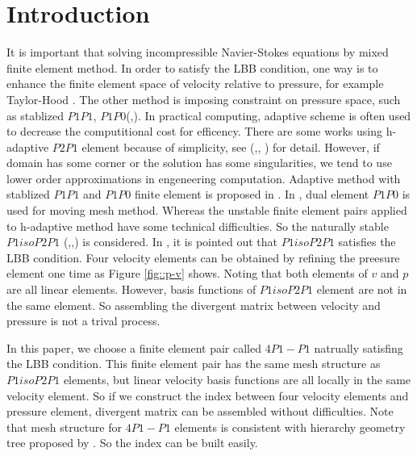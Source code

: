 \documentclass[a4paper, 11pt]{article}
\begin{document}
\section{Introduction}

    It is important that solving incompressible
    Navier-Stokes equations by mixed finite element method. In order to
    satisfy the LBB condition, one way is to enhance the finite
    element space of velocity relative to pressure, for example 
    Taylor-Hood \cite{taylor1974navier}. The other method is imposing
    constraint on pressure space, such as stablized $P1P1$,
    $P1P0$(\cite{li2009performance},\cite{bochev2006stabilization}). 
    In practical computing, adaptive scheme is often used to decrease the
    computitional cost for efficency. There are some works
    using h-adaptive $P2P1$ element because of simplicity, see
    (\cite{danaila2014newton},\cite{ebeida2009unsteady},
    \cite{berrone2009space}) for detail. However, if domain has some
    corner or the solution has some singularities, we tend to use lower
    order approximations in engeneering computation. Adaptive method with
    stablized $P1P1$ and $P1P0$ finite element is proposed in
    \cite{zheng2010posteriori}. In \cite{di2005moving},
    dual element $P1P0$ is used for moving mesh method. Whereas the
    unstable finite element pairs applied to h-adaptive method have some
    technical difficulties. So the naturally stable $P1isoP2P1$
    (\cite{vanden2009kinetic},\cite{fujima1998iso},\cite{bercovier1979error})
    is considered. In \cite{bercovier1979error}, it is pointed out that
    $P1isoP2P1$  satisfies the LBB condition. Four velocity
    elements can be obtained by refining the preesure element one
    time as Figure \ref{fig::p-v} shows. Noting that both elements of
    $v$ and $p$ are all linear elements. However, basis functions of
    $P1isoP2P1$ element are not in the same element. So
    assembling the divergent matrix between velocity and pressure is
    not a trival process. 
    
    In this paper, we choose a finite element pair called $4P1-P1$
    natrually satisfing the LBB condition. This finite element
    pair has the same mesh structure as $P1isoP2P1$ elements, but
    linear velocity basis functions are all locally in the same velocity
    element. So if we construct the index between four velocity
    elements and pressure element, divergent matrix can be assembled
    without difficulties. Note that mesh structure for $4P1-P1$ elements is
    consistent with hierarchy geometry tree proposed by
    \cite{li2005multi}. So the index can be built easily.
\end{document}
